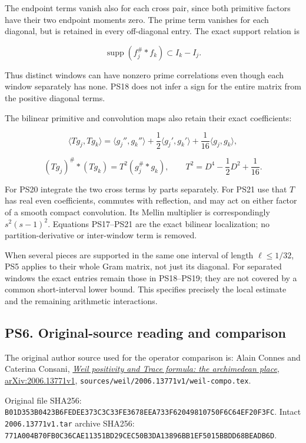\documentclass[
  10pt,
  a4paper,
]{article}
\begin{document}
The endpoint terms vanish also for each cross pair, since both primitive
factors have their two endpoint moments zero. The prime term vanishes
for each diagonal, but is retained in every off-diagonal entry. The
exact support relation is

\[
\operatorname{supp}(f_j^\#*f_k)\subset I_k-I_j.
\tag{PS19}
\]

Thus distinct windows can have nonzero prime correlations even though
each window separately has none. PS18 does not infer a sign for the
entire matrix from the positive diagonal terms.

The bilinear primitive and convolution maps also retain their exact
coefficients:

\[
\langle Tg_j,Tg_k\rangle
=\langle g_j'',g_k''\rangle
+\frac12\langle g_j',g_k'\rangle
+\frac1{16}\langle g_j,g_k\rangle,
\tag{PS20}
\]

\[
(Tg_j)^\#*(Tg_k)
=T^2(g_j^\#*g_k),\qquad
T^2=D^4-\frac12D^2+\frac1{16}.
\tag{PS21}
\]

For PS20 integrate the two cross terms by parts separately. For PS21 use
that \(T\) has real even coefficients, commutes with reflection, and may
act on either factor of a smooth compact convolution. Its Mellin
multiplier is correspondingly \(s^2(s-1)^2\). Equations PS17--PS21 are
the exact bilinear localization; no partition-derivative or inter-window
term is removed.

When several pieces are supported in the same one interval of length
\(\ell\le1/32\), PS5 applies to their whole Gram matrix, not just its
diagonal. For separated windows the exact entries remain those in
PS18--PS19; they are not covered by a common short-interval lower bound.
This specifies precisely the local estimate and the remaining arithmetic
interactions.

\subsection{PS6. Original-source reading and
comparison}\label{ps6.-original-source-reading-and-comparison}

The original author source used for the operator comparison is: Alain
Connes and Caterina Consani,
\href{https://arxiv.org/src/2006.13771v1}{\emph{Weil positivity and
Trace formula: the archimedean place}, arXiv:2006.13771v1},
\texttt{sources/\allowbreak{}weil/\allowbreak{}2006.\allowbreak{}13771v1/\allowbreak{}weil-\allowbreak{}compo.\allowbreak{}tex}.

Original file SHA256:
\texttt{B01D353B\allowbreak{}0423B6FE\allowbreak{}DEE373C3\allowbreak{}C33FE367\allowbreak{}8EEA733F\allowbreak{}62049810\allowbreak{}750F6C64\allowbreak{}EF20F3FC}.
Intact \texttt{2006.\allowbreak{}13771v1.\allowbreak{}tar} archive SHA256:
\texttt{771A004B\allowbreak{}70FB0C36\allowbreak{}CAE11351\allowbreak{}BD29CEC5\allowbreak{}0B3DA138\allowbreak{}96BB1EF5\allowbreak{}015BBDD6\allowbreak{}8BEADB6D}.
\end{document}

